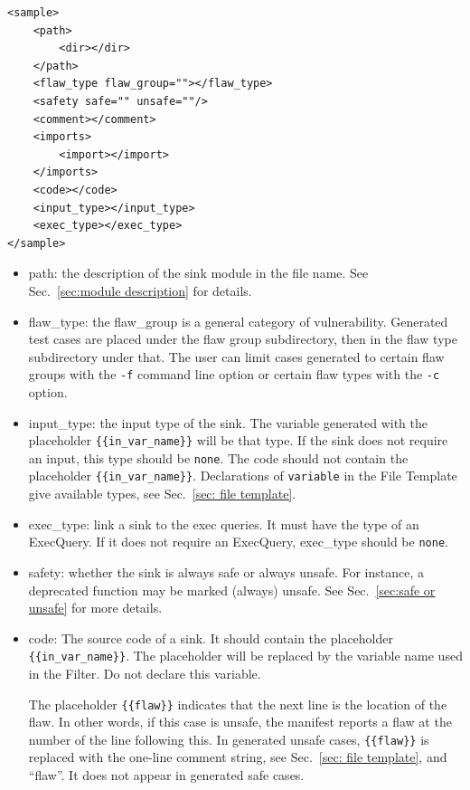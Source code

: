 \documentclass[12pt]{article}
\begin{document}
\begin{verbatim}
<sample>
    <path>
        <dir></dir>
    </path>
    <flaw_type flaw_group=""></flaw_type>
    <safety safe="" unsafe=""/>
    <comment></comment>
    <imports>
        <import></import>
    </imports>
    <code></code>
    <input_type></input_type>
    <exec_type></exec_type>
</sample>
\end{verbatim}

\begin{itemize}
    \item path: the description of the sink module in the file name.
      See Sec.~\ref{sec:module description} for details.

    \item flaw\_type: the flaw\_group is a general category of vulnerability.
    Generated test cases are placed under the flaw group subdirectory, then
    in the flaw type subdirectory under that. The user can limit
    cases generated to certain flaw groups with the \verb|-f| command
    line option or certain flaw types with the \verb|-c| option.
    
    \item input\_type: the input type of the sink. The variable
    generated with the placeholder \verb|{{in_var_name}}| will be 
    that type.  If the sink does not
    require an input, this type should be \verb|none|. The code 
    should not contain
    the placeholder \verb|{{in_var_name}}|.
    Declarations of \verb|variable| in the File Template give
    available types, see Sec.~\ref{sec: file template}.

    \item exec\_type: link a sink to the exec queries.  It must have 
    the type of
    an ExecQuery. If it does not require an ExecQuery, 
    exec\_type should be \verb|none|.

    \item safety: whether the sink is always safe or always unsafe.  For instance, a
      deprecated function may be marked (always) unsafe.
      See Sec.~\ref{sec:safe or unsafe}
      for more details.
    
    \item code: The source code of a sink. It should contain the placeholder
    \verb|{{in_var_name}}|.  The placeholder will be replaced by the variable
    name used in the Filter.  Do not declare this variable.

    The placeholder \verb|{{flaw}}| indicates that the next line is the location
    of the flaw.  In other words, if this case is unsafe, the manifest reports a
    flaw at the number of the line following this.  In generated unsafe cases,
    \verb|{{flaw}}| is replaced with the one-line comment string,
    see Sec.~\ref{sec: file template}, and ``flaw''.
    It does not appear in generated safe cases.
\end{itemize}
\end{document}
